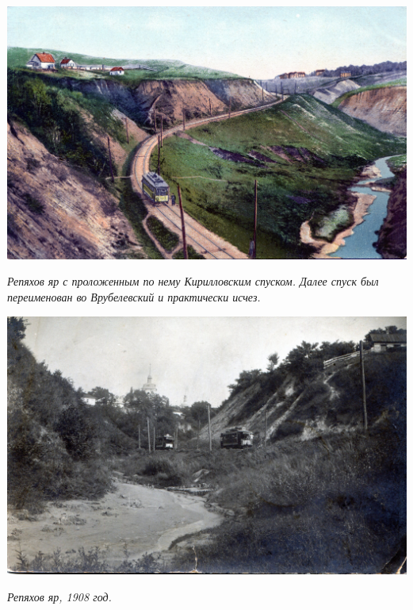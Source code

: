 \begin{center}
\includegraphics[width=\linewidth]{rpix/repyar.jpg}

\textit{Репяхов яр с проложенным по нему Кирилловским спуском. Далее спуск был переименован во Врубелевский и практически исчез.}
\end{center}


\begin{center}
\includegraphics[width=\linewidth]{rpix/repyar1908.jpg}

\textit{Репяхов яр, 1908 год.}
\end{center}


